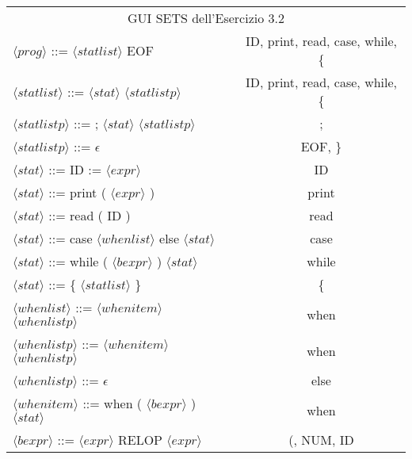 \documentclass[12pt]{article}
\begin{document}
\begin{table}[]
    \centering
    \begin{tabular}{|l|c|}
    \multicolumn{2}{|c|}{GUI SETS dell'Esercizio 3.2}                                         \\
    $\langle prog \rangle$ ::= $\langle statlist \rangle$ EOF            & ID, print, read, case, while, \{       \\
    $\langle statlist \rangle$ ::= $\langle stat \rangle$ $\langle statlistp \rangle$          & ID, print, read, case, while, \{       \\
    $\langle statlistp \rangle$ ::= ; $\langle stat \rangle$ $\langle statlistp \rangle$       & ;                                      \\
    $\langle statlistp \rangle$ ::= $\epsilon$            & EOF, \}                                \\
    $\langle stat \rangle$ ::= ID := $\langle expr \rangle$       & ID                                     \\
    $\langle stat \rangle$ ::= print ( $\langle expr \rangle$ )   & print                                  \\
    $\langle stat \rangle$ ::= read ( ID )   & read                                   \\
    $\langle stat \rangle$ ::= case $\langle whenlist \rangle$ else $\langle stat \rangle$ & case                                   \\
    $\langle stat \rangle$ ::= while ( $\langle bexpr \rangle$ ) $\langle stat \rangle$ & while                                  \\
    $\langle stat \rangle$ ::= \{ $\langle statlist \rangle$ \}       & \{                                     \\
    $\langle whenlist \rangle$ ::= $\langle whenitem \rangle$ $\langle whenlistp \rangle$          & when                                   \\
    $\langle whenlistp \rangle$ ::= $\langle whenitem \rangle$ $\langle whenlistp \rangle$         & when                                   \\
    $\langle whenlistp \rangle$ ::= $\epsilon$            & else                                   \\
    $\langle whenitem \rangle$ ::= when ( $\langle bexpr \rangle$ ) $\langle stat \rangle$  & when                                   \\
    $\langle bexpr \rangle$ ::= $\langle expr \rangle$ RELOP $\langle expr \rangle$     & (, NUM, ID                             \\

\end{tabular}
\end{table}
\end{document}
